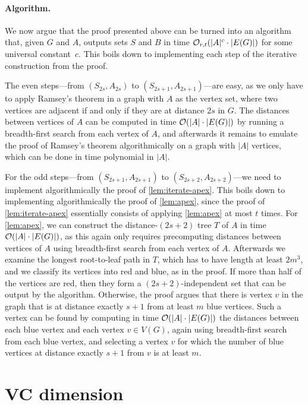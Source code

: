 \paragraph{Algorithm.} We now argue that the proof presented above can be turned into an algorithm that, 
given $G$ and $A$, outputs sets $S$ and $B$ in time $\mathcal{O}_{r,t}(|A|^c\cdot |E(G)|)$ for some universal constant~$c$.
This boils down to implementing each step of the iterative construction from the proof.

The even steps---from $(S_{2s},A_{2s})$ to $(S_{2s+1},A_{2s+1})$---are easy, as we only have to apply Ramsey's theorem in a graph with $A$ as the vertex set, where two vertices are adjacent if and only
if they are at distance $2s$ in $G$. The distances between vertices of $A$ can be computed in time $\mathcal{O}(|A|\cdot |E(G)|)$ by running a breadth-first search from each vertex of $A$, and afterwards it remains
to emulate the proof of Ramsey's theorem algorithmically on a graph with $|A|$ vertices, which can be done in time polynomial in $|A|$.

For the odd steps---from $(S_{2s+1},A_{2s+1})$ to $(S_{2s+2},A_{2s+2})$---we need to implement algorithmically the proof of \cref{lem:iterate-apex}. 
This boils down to implementing algorithmically the proof of \cref{lem:apex}, since
the proof of \cref{lem:iterate-apex} essentially consists of applying \cref{lem:apex} at most $t$ times. For \cref{lem:apex}, we can construct the distance-$(2s+2)$ tree $T$ of $A$ in time
$\mathcal{O}(|A|\cdot |E(G)|)$, as this again only requires precomputing distances between vertices of $A$ using breadth-first search from each vertex of $A$.
Afterwards we examine the longest root-to-leaf path in $T$, which has to have length at least $2m^3$, and we classify its vertices into red and blue, as in the proof. If more than half of the vertices are red,
then they form a $(2s+2)$-independent set that can be output by the algorithm. Otherwise, the proof argues that there is vertex $v$ in the graph that is at distance exactly $s+1$ from at least $m$ blue vertices.
Such a vertex can be found by computing in time $\mathcal{O}(|A|\cdot |E(G)|)$ the distances between each blue vertex and each vertex $v\in V(G)$, again using breadth-first search from each blue vertex, and selecting
a vertex $v$ for which the number of blue vertices at distance exactly $s+1$ from $v$ is at least $m$. 


\section{VC dimension}\label{sec:vc}

